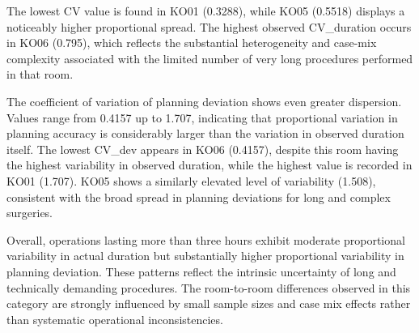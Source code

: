 \documentclass[
]{article}
\begin{document}
The lowest CV value is found in KO01 (0.3288), while KO05 (0.5518)
displays a noticeably higher proportional spread. The highest observed
CV\_duration occurs in KO06 (0.795), which reflects the substantial
heterogeneity and case-mix complexity associated with the limited number
of very long procedures performed in that room.

The coefficient of variation of planning deviation shows even greater
dispersion. Values range from 0.4157 up to 1.707, indicating that
proportional variation in planning accuracy is considerably larger than
the variation in observed duration itself. The lowest CV\_dev appears in
KO06 (0.4157), despite this room having the highest variability in
observed duration, while the highest value is recorded in KO01 (1.707).
KO05 shows a similarly elevated level of variability (1.508), consistent
with the broad spread in planning deviations for long and complex
surgeries.

Overall, operations lasting more than three hours exhibit moderate
proportional variability in actual duration but substantially higher
proportional variability in planning deviation. These patterns reflect
the intrinsic uncertainty of long and technically demanding procedures.
The room-to-room differences observed in this category are strongly
influenced by small sample sizes and case mix effects rather than
systematic operational inconsistencies.
\end{document}
